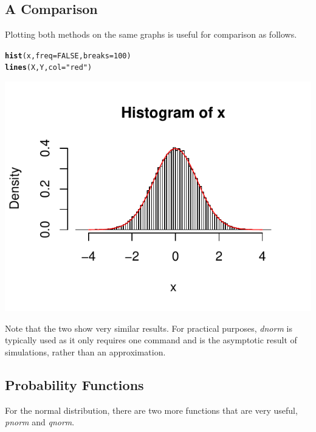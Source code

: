 \documentclass{report}\usepackage[]{graphicx}\usepackage[]{color}
\makeatletter
\def\maxwidth{ %
  \ifdim\Gin@nat@width>\linewidth
    \linewidth
  \else
    \Gin@nat@width
  \fi
}
\newcommand{\hlnum}[1]{\textcolor[rgb]{0.686,0.059,0.569}{#1}}%
\newcommand{\hlstr}[1]{\textcolor[rgb]{0.192,0.494,0.8}{#1}}%
\newcommand{\hlstd}[1]{\textcolor[rgb]{0.345,0.345,0.345}{#1}}%
\newcommand{\hlkwc}[1]{\textcolor[rgb]{0.333,0.667,0.333}{#1}}%
\newcommand{\hlkwd}[1]{\textcolor[rgb]{0.737,0.353,0.396}{\textbf{#1}}}%
\newenvironment{kframe}{%
 \def\at@end@of@kframe{}%
 \ifinner\ifhmode%
  \def\at@end@of@kframe{\end{minipage}}%
  \begin{minipage}{\columnwidth}%
 \fi\fi%
 \def\FrameCommand##1{\hskip\@totalleftmargin \hskip-\fboxsep
 \colorbox{shadecolor}{##1}\hskip-\fboxsep
     \hskip-\linewidth \hskip-\@totalleftmargin \hskip\columnwidth}%
 \MakeFramed {\advance\hsize-\width
   \@totalleftmargin\z@ \linewidth\hsize
   \@setminipage}}%
 {\par\unskip\endMakeFramed%
 \at@end@of@kframe}
\newenvironment{knitrout}{}{} %
\makeatother
\begin{document}
\subsection{A Comparison} 
Plotting both methods on the same graphs is useful for comparison as follows.  
\begin{knitrout}
\color{fgcolor}\begin{kframe}
\begin{alltt}
\hlkwd{hist}\hlstd{(x,} \hlkwc{freq} \hlstd{=} \hlnum{FALSE}\hlstd{,} \hlkwc{breaks} \hlstd{=} \hlnum{100}\hlstd{)}
\hlkwd{lines}\hlstd{(X,Y,} \hlkwc{col} \hlstd{=} \hlstr{"red"}\hlstd{)}
\end{alltt}
\end{kframe}

{\centering \includegraphics[width=\maxwidth]{figure/unnamed-chunk-49-1} 

}



\end{knitrout}

Note that the two show very similar results.  For practical purposes, \textit{dnorm} is typically used as it only requires one command and is the asymptotic result of simulations, rather than an approximation.  

\subsection{Probability Functions}
For the normal distribution, there are two more functions that are very useful, \textit{pnorm} and \textit{qnorm}. 
\end{document}
